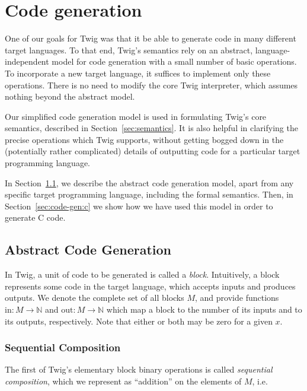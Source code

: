 
\section{Code generation}
\label{sec:code-gen}

One of our goals for Twig was that it be able to generate code in many different target languages. To that end, Twig's semantics rely on an abstract, language-independent model for code generation with a small number of basic operations. To incorporate a new target language, it suffices to implement only these operations. There is no need to modify the core Twig interpreter, which assumes nothing beyond the abstract model.

Our simplified code generation model is used in formulating Twig's core semantics, described in Section~\ref{sec:semantics}. It is also helpful in clarifying the precise operations which Twig supports, without getting bogged down in the (potentially rather complicated) details of outputting code for a particular target programming language.

In Section~\ref{sec:code-gen:abstract}, we describe the abstract code generation model, apart from any specific target programming language, including the formal semantics. Then, in Section~\ref{sec:code-gen:c} we show how we have used this model in order to generate C code.

\subsection{Abstract Code Generation}
\label{sec:code-gen:abstract}

In Twig, a unit of code to be generated is called a \emph{block}. Intuitively, a block represents some code in the target language, which accepts inputs and produces outputs. We denote the complete set of all blocks $M$, and provide functions 
$\mbox{in} : M \to \mathbb{N}$ and $\mbox{out} : M \to \mathbb{N}$ which map a block to the number of its inputs and to its outputs, respectively. Note that either or both may be zero for a given $x$.

\subsubsection{Sequential Composition}

The first of Twig's elementary block binary operations is called  \emph{sequential composition}, which we represent as ``addition'' on the elements of $M$, i.e. 

